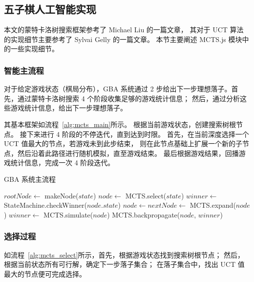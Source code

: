 \documentclass[UTF8,cs4size]{ctexart}
\begin{document}
\subsection{五子棋人工智能实现}
本文的蒙特卡洛树搜索框架参考了 Michael Liu 的一篇文章\cite{web:medium_mcts}，
其对于 UCT 算法的实现细节主要参考了 Sylvai Gelly 的一篇文章\cite{DBLP:journals/ai/GellyS11}。
本节主要阐述 MCTS.js 模块中的一些实现细节。
\subsubsection{智能主流程}
对于给定游戏状态（棋局分布），GBA 系统通过 2 步给出下一步理想落子。首先，通过蒙特卡洛树搜索 4 个阶段收集足够的游戏统计信息；
然后，通过分析这些游戏统计信息，给出下一步理想落子。

其基本框架如流程~\ref{alg:mcts_main}所示。
根据当前游戏状态，创建搜索树根节点。
接下来进行 4 阶段的不停迭代，直到达到时限。
首先，在当前深度选择一个 UCT 值最大的节点，若游戏未到此步结束，
则在此节点基础上扩展一个新的子节点，然后沿着此路径进行随机模拟，直至游戏结束。
最后根据游戏结果，回播游戏统计信息，完成一次 4 阶段迭代。

\begin{algorithm}
	\caption{GBA 系统主流程}
	\label{alg:mcts_main}
  \begin{algorithmic}[1]
      \State $rootNode \gets$ makeNode($state$)
        \State $node \gets$ MCTS.select($state$)
        \State $winner \gets$ StateMachine.checkWinner($node.state$)
          \State $node \gets nextNode \gets$ MCTS.expand($node$)
          \State $winner \gets$ MCTS.simulate($node$)
        \EndIf
        \State MCTS.backpropagate($node$, $winner$)
      \EndWhile
    \EndFunction
	\end{algorithmic}  
\end{algorithm}

\subsubsection{选择过程}
如流程~\ref{alg:mcts_select}所示，首先，根据游戏状态找到搜索树根节点；
然后，根据当前状态所有可行解，确定下一步落子集合；
在落子集合中，找出 UCT 值最大的节点便可完成选择。
\end{document}
